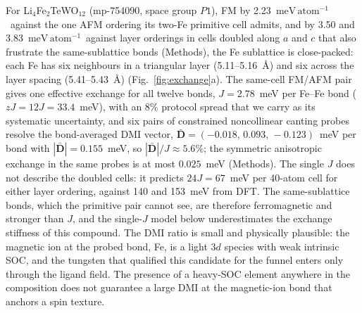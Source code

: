 \documentclass[aps,prb,preprint,superscriptaddress,longbibliography,nofootinbib]{revtex4-2}
\newcommand{\meVat}{\ensuremath{\mathrm{meV\,atom^{-1}}}}
\begin{document}
For Li$_4$Fe$_2$TeWO$_{12}$ (mp-754090, space group $P1$), FM by 2.23~\meVat\ against the one AFM ordering its
two-Fe primitive cell admits, and by 3.50 and 3.83~\meVat\ against layer orderings in cells doubled along $a$
and $c$ that also frustrate the same-sublattice bonds (Methods), the Fe sublattice is
close-packed: each Fe has six neighbours in a triangular layer (5.11--5.16~\AA) and six across the layer
spacing (5.41--5.43~\AA) (Fig.~\ref{fig:exchange}a). The same-cell FM/AFM pair gives one effective exchange for
all twelve bonds, $J=2.78$~meV per Fe--Fe bond ($zJ=12J=33.4$~meV), with an 8\% protocol spread that we carry
as its systematic uncertainty, and six pairs of constrained noncollinear canting probes resolve the
bond-averaged DMI vector, $\bar{\mathbf{D}}=(-0.018,\,0.093,\,-0.123)$~meV per bond with
$|\bar{\mathbf{D}}|=0.155$~meV, so $|\bar{\mathbf{D}}|/J\approx5.6\%$; the symmetric anisotropic exchange in
the same probes is at most $0.025$~meV (Methods). The single $J$ does not describe the doubled cells: it
predicts $24J=67$~meV per 40-atom cell for either layer ordering, against 140 and 153~meV from DFT. The
same-sublattice bonds, which the primitive pair cannot see, are therefore ferromagnetic and stronger than $J$,
and the single-$J$ model below underestimates the exchange stiffness of this compound. The DMI ratio is
small and
physically plausible:
the magnetic ion at the probed bond, Fe, is a light $3d$ species with weak intrinsic SOC, and the tungsten
that qualified this candidate for the funnel enters only through the ligand field. The presence of a heavy-SOC
element anywhere in the composition does not guarantee a large DMI at the magnetic-ion bond that anchors a
spin texture.
\end{document}
